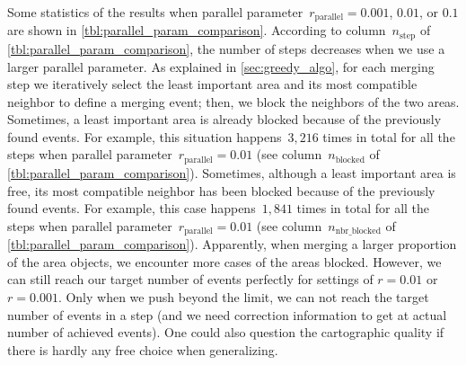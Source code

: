 \documentclass[ijgi,article,submit,moreauthors,pdftex]{Definitions/mdpi}
\begin{document}
Some statistics of the results when 
parallel parameter~$r_\mathrm{parallel}=0.001$, $0.01$, or $0.1$ 
are shown in \tbl\ref{tbl:parallel_param_comparison}.
According to column~$n_\mathrm{step}$ of \tbl\ref{tbl:parallel_param_comparison},
the number of steps decreases 
when we use a larger parallel parameter.
As explained in \sect\ref{sec:greedy_algo}, 
for each merging step we iteratively select the least important area 
and its most compatible neighbor to define a merging event; 
then, we block the neighbors of the two areas.
Sometimes, a least important area is already blocked 
because of the previously found events.
For example, this situation happens~$3{,}216$ times in total for all the steps
when parallel parameter~$r_\mathrm{parallel}=0.01$
(see column~$n_\mathrm{blocked}$ of \tbl\ref{tbl:parallel_param_comparison}).
%
Sometimes, although a least important area is free, 
its most compatible neighbor has been blocked 
because of the previously found events.
For example, this case happens~$1{,}841$ times in total for all the steps
when parallel parameter~$r_\mathrm{parallel}=0.01$
(see column~$n_\mathrm{nbr\_blocked}$ of \tbl\ref{tbl:parallel_param_comparison}).
%
Apparently, when merging a larger proportion of 
the area objects, we encounter more cases of the areas blocked.
However, we can still reach our target number of events perfectly 
for settings of $r=0.01$ or $r=0.001$. 
Only when we push beyond the limit, 
we can not reach the target number of events in a step 
(and we need correction information to get at actual number of achieved events). 
One could also question the cartographic quality 
if there is hardly any free choice when generalizing.
\end{document}
